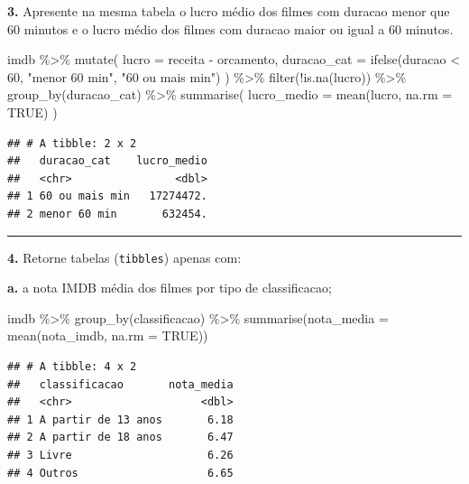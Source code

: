 \documentclass[
]{book}
\newenvironment{Shaded}{\begin{snugshade}}{\end{snugshade}}
\newcommand{\AttributeTok}[1]{\textcolor[rgb]{0.77,0.63,0.00}{#1}}
\newcommand{\ConstantTok}[1]{\textcolor[rgb]{0.00,0.00,0.00}{#1}}
\newcommand{\DecValTok}[1]{\textcolor[rgb]{0.00,0.00,0.81}{#1}}
\newcommand{\FunctionTok}[1]{\textcolor[rgb]{0.00,0.00,0.00}{#1}}
\newcommand{\NormalTok}[1]{#1}
\newcommand{\SpecialCharTok}[1]{\textcolor[rgb]{0.00,0.00,0.00}{#1}}
\newcommand{\StringTok}[1]{\textcolor[rgb]{0.31,0.60,0.02}{#1}}
\begin{document}
\textbf{3.} Apresente na mesma tabela o lucro médio dos filmes com duracao menor que 60 minutos e o lucro médio dos filmes com duracao maior ou igual a 60 minutos.

\begin{Shaded}
\begin{Highlighting}[]
\NormalTok{imdb }\SpecialCharTok{\%\textgreater{}\%} 
  \FunctionTok{mutate}\NormalTok{(}
    \AttributeTok{lucro =}\NormalTok{ receita }\SpecialCharTok{{-}}\NormalTok{ orcamento,}
    \AttributeTok{duracao\_cat =} \FunctionTok{ifelse}\NormalTok{(duracao }\SpecialCharTok{\textless{}} \DecValTok{60}\NormalTok{, }\StringTok{"menor 60 min"}\NormalTok{, }\StringTok{"60 ou mais min"}\NormalTok{)}
\NormalTok{  ) }\SpecialCharTok{\%\textgreater{}\%} 
  \FunctionTok{filter}\NormalTok{(}\SpecialCharTok{!}\FunctionTok{is.na}\NormalTok{(lucro)) }\SpecialCharTok{\%\textgreater{}\%} 
  \FunctionTok{group\_by}\NormalTok{(duracao\_cat) }\SpecialCharTok{\%\textgreater{}\%} 
  \FunctionTok{summarise}\NormalTok{(}
    \AttributeTok{lucro\_medio =} \FunctionTok{mean}\NormalTok{(lucro, }\AttributeTok{na.rm =} \ConstantTok{TRUE}\NormalTok{)}
\NormalTok{  )}
\end{Highlighting}
\end{Shaded}

\begin{verbatim}
## # A tibble: 2 x 2
##   duracao_cat    lucro_medio
##   <chr>                <dbl>
## 1 60 ou mais min   17274472.
## 2 menor 60 min       632454.
\end{verbatim}

\begin{center}\rule{0.5\linewidth}{0.5pt}\end{center}

\textbf{4.} Retorne tabelas (\texttt{tibbles}) apenas com:

\textbf{a.} a nota IMDB média dos filmes por tipo de classificacao;

\begin{Shaded}
\begin{Highlighting}[]
\NormalTok{imdb }\SpecialCharTok{\%\textgreater{}\%} 
  \FunctionTok{group\_by}\NormalTok{(classificacao) }\SpecialCharTok{\%\textgreater{}\%} 
  \FunctionTok{summarise}\NormalTok{(}\AttributeTok{nota\_media =} \FunctionTok{mean}\NormalTok{(nota\_imdb, }\AttributeTok{na.rm =} \ConstantTok{TRUE}\NormalTok{))}
\end{Highlighting}
\end{Shaded}

\begin{verbatim}
## # A tibble: 4 x 2
##   classificacao       nota_media
##   <chr>                    <dbl>
## 1 A partir de 13 anos       6.18
## 2 A partir de 18 anos       6.47
## 3 Livre                     6.26
## 4 Outros                    6.65
\end{verbatim}
\end{document}
